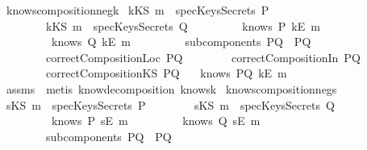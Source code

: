 \begin{isabellebody}
{\isafoldproof}\isadelimproof
\isanewline
\endisadelimproof
\isanewline
{}\isamarkupfalse \ knows{\isacharunderscore}composition{\isacharunderscore}neg{}{\isacharunderscore}k{\isacharcolon}\isanewline
{}\ {\isachardoublequoteopen}kKS\ m\ {\isasymnotin}\ specKeysSecrets\ P{\isachardoublequoteclose}\isanewline
\ \ \ \ \ \ \ \ {\isachardoublequoteopen}kKS\ m\ {\isasymnotin}\ specKeysSecrets\ Q{\isachardoublequoteclose}\isanewline
\ \ \ \ \ \ \ \ {\isachardoublequoteopen}{\isasymnot}\ knows\ P\ {\isacharbrackleft}kE\ m{\isacharbrackright}{\isachardoublequoteclose}\isanewline
\ \ \ \ \ \ \ \ {\isachardoublequoteopen}{\isasymnot}\ knows\ Q\ {\isacharbrackleft}kE\ m{\isacharbrackright}{\isachardoublequoteclose}\ \isanewline
\ \ \ \ \ \ \ \ {\isachardoublequoteopen}subcomponents\ PQ\ {\isacharequal}\ {\isacharbraceleft}P{\isacharcomma}Q{\isacharbraceright}{\isachardoublequoteclose}\isanewline
\ \ \ \ \ \ \ \ {\isachardoublequoteopen}correctCompositionLoc\ PQ{\isachardoublequoteclose}\isanewline
\ \ \ \ \ \ \ \ {\isachardoublequoteopen}correctCompositionIn\ PQ{\isachardoublequoteclose}\isanewline
\ \ \ \ \ \ \ \ {\isachardoublequoteopen}correctCompositionKS\ PQ{\isachardoublequoteclose}\ \isanewline
{}\ {\isachardoublequoteopen}{\isasymnot}\ knows\ PQ\ {\isacharbrackleft}kE\ m{\isacharbrackright}{\isachardoublequoteclose}\isanewline
\isadelimproof
\endisadelimproof
\isatagproof
{}\isamarkupfalse \ assms\ \isamarkupfalse \ {\isacharparenleft}metis\ know{\isacharunderscore}decomposition\ knows{}k{\isacharparenright}\endisatagproof
{\isafoldproof}\isadelimproof
\isanewline
\endisadelimproof
\isanewline
{}\isamarkupfalse \ knows{\isacharunderscore}composition{\isacharunderscore}neg{}{\isacharunderscore}s{\isacharcolon}\isanewline
{}\ {\isachardoublequoteopen}sKS\ m\ {\isasymnotin}\ specKeysSecrets\ P{\isachardoublequoteclose}\isanewline
\ \ \ \ \ \ \ \ {\isachardoublequoteopen}sKS\ m\ {\isasymnotin}\ specKeysSecrets\ Q{\isachardoublequoteclose}\isanewline
\ \ \ \ \ \ \ \ {\isachardoublequoteopen}{\isasymnot}\ knows\ P\ {\isacharbrackleft}sE\ m{\isacharbrackright}{\isachardoublequoteclose}\isanewline
\ \ \ \ \ \ \ \ {\isachardoublequoteopen}{\isasymnot}\ knows\ Q\ {\isacharbrackleft}sE\ m{\isacharbrackright}{\isachardoublequoteclose}\ \isanewline
\ \ \ \ \ \ \ \ {\isachardoublequoteopen}subcomponents\ PQ\ {\isacharequal}\ {\isacharbraceleft}P{\isacharcomma}Q{\isacharbraceright}{\isachardoublequoteclose}\isanewline

\end{isabellebody}
